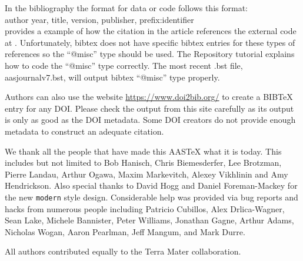 \documentclass[linenumbers,trackchanges]{aastex7}
\begin{document}
In the bibliography the format for data or code follows this format: \\

\noindent author year, title, version, publisher, prefix:identifier\\

\citet{2015ApJ...805...23C} provides a example of how the citation in the
article references the external code at
.  Unfortunately, bibtex does
not have specific bibtex entries for these types of references so the
``@misc'' type should be used.  The Repository tutorial explains how to
code the ``@misc'' type correctly.  The most recent .bst file, aasjournalv7.bst, will output bibtex ``@misc'' type properly.

Authors can also use the website \url{https://www.doi2bib.org/} to create a BIBTeX entry for any DOI. Please check the output from this site carefully as its output is only as good as the DOI metadata. Some DOI creators do not provide enough metadata to construct an adequate citation.

\begin{acknowledgments}
We thank all the people that have made this AASTeX what it is today.  This
includes but not limited to Bob Hanisch, Chris Biemesderfer, Lee Brotzman,
Pierre Landau, Arthur Ogawa, Maxim Markevitch, Alexey Vikhlinin and Amy
Hendrickson. Also special thanks to David Hogg and Daniel Foreman-Mackey
for the new {\tt\string modern} style design. Considerable help was provided via bug
reports and hacks from numerous people including Patricio Cubillos, Alex
Drlica-Wagner, Sean Lake, Michele Bannister, Peter Williams, Jonathan
Gagne, Arthur Adams, Nicholas Wogan, Aaron Pearlman, Jeff Mangum, and Mark Durre.
\end{acknowledgments}

\begin{contribution}

All authors contributed equally to the Terra Mater collaboration.


\end{contribution}
\end{document}
